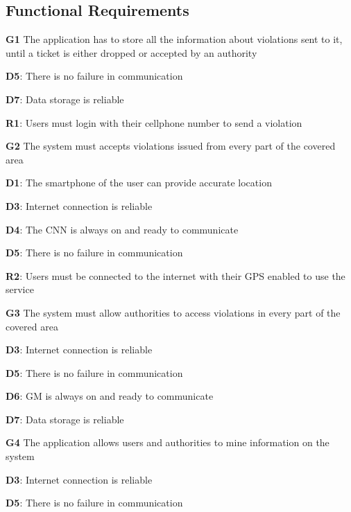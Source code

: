 \subsection{Functional Requirements}
\begin{outline}

\1  \textbf{G1} The application has to store all the information about violations sent to it, until a ticket is either dropped or accepted by an authority

\2 \textbf{D5}: There is no failure in communication

\2 \textbf{D7}: Data storage is reliable

\2 \textbf{R1}: Users must login with their cellphone number to send a violation



\1  \textbf{G2} The system must accepts violations issued from every part of the covered area

\2 \textbf{D1}: The smartphone of the user can provide accurate location

\2 \textbf{D3}: Internet connection is reliable

\2 \textbf{D4}: The CNN is always on and ready to communicate

\2 \textbf{D5}: There is no failure in communication

\2 \textbf{R2}: Users must be connected to the internet with their GPS enabled to use the service


 
\1  \textbf{G3} The system must allow authorities to access violations in every part of the covered area

\2 \textbf{D3}: Internet connection is reliable

\2 \textbf{D5}: There is no failure in communication

\2 \textbf{D6}: GM is always on and ready to communicate

\2 \textbf{D7}: Data storage is reliable


\1  \textbf{G4} The application allows users and authorities to mine information on the system

\2 \textbf{D3}: Internet connection is reliable

\2 \textbf{D5}: There is no failure in communication


\end{outline}
